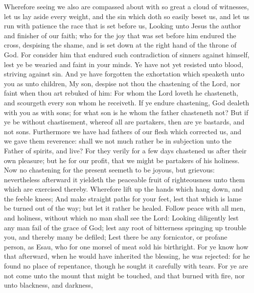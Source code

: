 Wherefore seeing we also are compassed about with so
great a cloud of witnesses, let us lay aside every weight, and the sin
which doth so easily beset us, and let us run with patience the race
that is set before us,  Looking unto Jesus the author and
finisher of our faith; who for the joy that was set before him endured
the cross, despising the shame, and is set down at the right hand of the
throne of God.  For consider him that endured such
contradiction of sinners against himself, lest ye be wearied and faint
in your minds.  Ye have not yet resisted unto blood,
striving against sin.  And ye have forgotten the
exhortation which speaketh unto you as unto children, My son, despise
not thou the chastening of the Lord, nor faint when thou art rebuked of
him:  For whom the Lord loveth he chasteneth, and
scourgeth every son whom he receiveth.  If ye endure
chastening, God dealeth with you as with sons; for what son is he whom
the father chasteneth not?  But if ye be without
chastisement, whereof all are partakers, then are ye bastards, and not
sons.  Furthermore we have had fathers of our flesh which
corrected us, and we gave them reverence: shall we not much rather be in
subjection unto the Father of spirits, and live?  For
they verily for a few days chastened us after their own pleasure; but he
for our profit, that we might be partakers of his holiness.
 Now no chastening for the present seemeth to be joyous,
but grievous: nevertheless afterward it yieldeth the peaceable fruit of
righteousness unto them which are exercised thereby. 
Wherefore lift up the hands which hang down, and the feeble knees;
 And make straight paths for your feet, lest that which
is lame be turned out of the way; but let it rather be healed.
 Follow peace with all men, and holiness, without which
no man shall see the Lord:  Looking diligently lest any
man fail of the grace of God; lest any root of bitterness springing up
trouble you, and thereby many be defiled;  Lest there be
any fornicator, or profane person, as Esau, who for one morsel of meat
sold his birthright.  For ye know how that afterward,
when he would have inherited the blessing, he was rejected: for he found
no place of repentance, though he sought it carefully with tears.
 For ye are not come unto the mount that might be
touched, and that burned with fire, nor unto blackness, and darkness,
